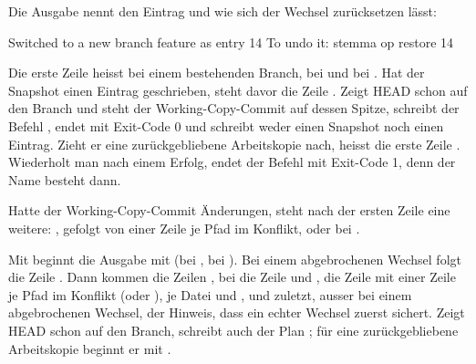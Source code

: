 Die Ausgabe nennt den Eintrag und wie sich der Wechsel zurücksetzen lässt:

\starttyping
Switched to a new branch feature as entry 14
To undo it: stemma op restore 14
\stoptyping

Die erste Zeile heisst  bei einem bestehenden Branch,
 bei  und  bei
. Hat der Snapshot einen Eintrag geschrieben, steht davor die Zeile
.
Zeigt HEAD schon auf den Branch und steht der Working-Copy-Commit auf dessen Spitze,
schreibt der Befehl , endet mit
Exit-Code 0 und schreibt weder einen Snapshot noch einen Eintrag.
Zieht er eine zurückgebliebene Arbeitskopie nach, heisst die erste Zeile
.
Wiederholt man  nach einem Erfolg, endet der Befehl mit Exit-Code 1, denn der
Name besteht dann.

Hatte der Working-Copy-Commit Änderungen, steht nach der ersten Zeile eine weitere:
, gefolgt von einer Zeile
 je Pfad im Konflikt, oder bei 
.

Mit  beginnt die Ausgabe mit  (bei  , bei 
).
Bei einem abgebrochenen Wechsel folgt die Zeile .
Dann kommen die Zeilen , bei  die Zeile 
und , die Zeile
mit einer Zeile  je Pfad im Konflikt (oder ), je Datei  und , und zuletzt, ausser bei einem
abgebrochenen Wechsel, der Hinweis, dass ein echter Wechsel zuerst sichert.
Zeigt HEAD schon auf den Branch, schreibt auch der Plan ;
für eine zurückgebliebene Arbeitskopie beginnt er mit
.

